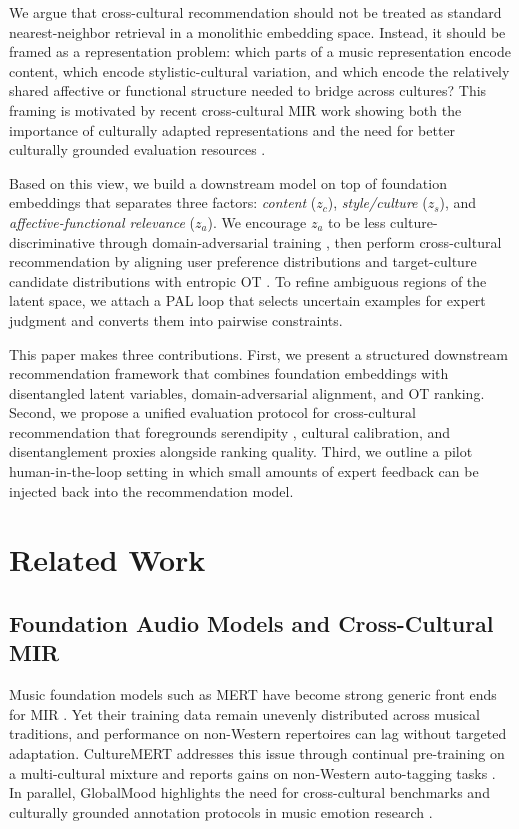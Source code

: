 \documentclass[10pt,twocolumn]{article}
\begin{document}
We argue that cross-cultural recommendation should not be treated as standard nearest-neighbor retrieval in a monolithic embedding space.
Instead, it should be framed as a representation problem:
which parts of a music representation encode content, which encode stylistic-cultural variation, and which encode the relatively shared affective or functional structure needed to bridge across cultures?
This framing is motivated by recent cross-cultural MIR work showing both the importance of culturally adapted representations \citep{kanatas2025culturemert} and the need for better culturally grounded evaluation resources \citep{lee2025globalmood}.

Based on this view, we build a downstream model on top of foundation embeddings that separates three factors:
\emph{content} ($z_c$), \emph{style/culture} ($z_s$), and \emph{affective-functional relevance} ($z_a$).
We encourage $z_a$ to be less culture-discriminative through domain-adversarial training \citep{ganin2016dann}, then perform cross-cultural recommendation by aligning user preference distributions and target-culture candidate distributions with entropic OT \citep{cuturi2013sinkhorn}.
To refine ambiguous regions of the latent space, we attach a PAL loop \citep{settles2009active} that selects uncertain examples for expert judgment and converts them into pairwise constraints.

This paper makes three contributions.
First, we present a structured downstream recommendation framework that combines foundation embeddings with disentangled latent variables, domain-adversarial alignment, and OT ranking.
Second, we propose a unified evaluation protocol for cross-cultural recommendation that foregrounds serendipity \citep{zhang2012auralist}, cultural calibration, and disentanglement proxies alongside ranking quality.
Third, we outline a pilot human-in-the-loop setting in which small amounts of expert feedback can be injected back into the recommendation model.

\section{Related Work}
\subsection{Foundation Audio Models and Cross-Cultural MIR}
Music foundation models such as MERT have become strong generic front ends for MIR \citep{li2023mert}.
Yet their training data remain unevenly distributed across musical traditions, and performance on non-Western repertoires can lag without targeted adaptation.
CultureMERT addresses this issue through continual pre-training on a multi-cultural mixture and reports gains on non-Western auto-tagging tasks \citep{kanatas2025culturemert}.
In parallel, GlobalMood highlights the need for cross-cultural benchmarks and culturally grounded annotation protocols in music emotion research \citep{lee2025globalmood}.
\end{document}
